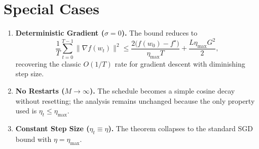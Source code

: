 \documentclass{article}
\begin{document}
\section*{Special Cases}
\begin{enumerate}[label=\alph*.]
\item \textbf{Deterministic Gradient ($\sigma=0$).} The bound reduces to
\[
\frac{1}{T}\sum_{t=0}^{T-1}\|\nabla f(w_t)\|^{2}\le
\frac{2\bigl(f(w_0)-f^{\star}\bigr)}{\eta_{\max}T}
+\frac{L\eta_{\max}G^{2}}{2},
\]
recovering the classic $O(1/T)$ rate for gradient descent with diminishing step size.
\item \textbf{No Restarts ($M\to\infty$).} The schedule becomes a simple cosine decay without resetting; the analysis remains unchanged because the only property used is $\eta_t\le\eta_{\max}$.
\item \textbf{Constant Step Size ($\eta_t\equiv\eta$).} The theorem collapses to the standard SGD bound with $\eta=\eta_{\max}$.
\end{enumerate}
\end{document}
